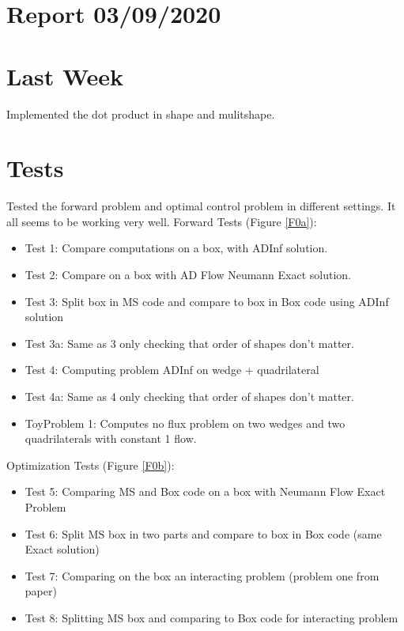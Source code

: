 \documentclass[11pt, a4paper]{article}
\theoremstyle{definition}
\begin{document}
	\section*{Report 03/09/2020}
	\section{Last Week}
	Implemented the dot product in shape and mulitshape.
	\section{Tests}
	Tested the forward problem and optimal control problem in different settings. It all seems to be working very well. 
	Forward Tests (Figure \ref{F0a}):
	\begin{itemize}
		\item Test 1: Compare computations on a box, with ADInf solution.
		\item Test 2: Compare on a box with AD Flow Neumann Exact solution.
		\item Test 3: Split box in MS code and compare to box in Box code using ADInf solution
		\item Test 3a: Same as 3 only checking that order of shapes don't matter.
		\item Test 4: Computing problem ADInf on wedge + quadrilateral
		\item Test 4a: Same as 4 only checking that order of shapes don't matter.
		\item ToyProblem 1: Computes no flux problem on two wedges and two quadrilaterals with constant 1 flow.
	\end{itemize} 
	Optimization Tests (Figure \ref{F0b}):
	\begin{itemize}
		\item Test 5: Comparing MS and Box code on a box with Neumann Flow Exact Problem
		\item Test 6: Split MS box in two parts and compare to box in Box code (same Exact solution)
		\item Test 7: Comparing on the box an interacting problem (problem one from paper)
		\item Test 8: Splitting MS box and comparing to Box code for interacting problem
	\end{itemize}
\end{document}
